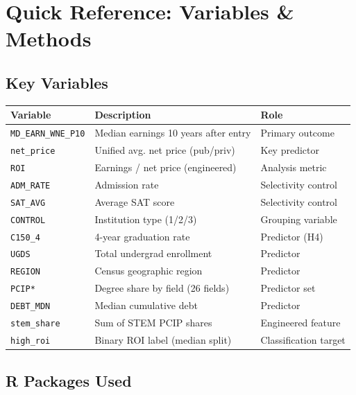 \documentclass[12pt, letterpaper]{article}
\begin{document}
\section{Quick Reference: Variables \& Methods}

\subsection{Key Variables}

\begin{center}
\begin{tabular}{p{3.5cm} p{6cm} p{3.5cm}}
\toprule
\textbf{Variable} & \textbf{Description} & \textbf{Role} \\
\midrule
\texttt{MD\_EARN\_WNE\_P10} & Median earnings 10 years after entry & Primary outcome \\
\texttt{net\_price} & Unified avg. net price (pub/priv) & Key predictor \\
\texttt{ROI} & Earnings / net price (engineered) & Analysis metric \\
\texttt{ADM\_RATE} & Admission rate & Selectivity control \\
\texttt{SAT\_AVG} & Average SAT score & Selectivity control \\
\texttt{CONTROL} & Institution type (1/2/3) & Grouping variable \\
\texttt{C150\_4} & 4-year graduation rate & Predictor (H4) \\
\texttt{UGDS} & Total undergrad enrollment & Predictor \\
\texttt{REGION} & Census geographic region & Predictor \\
\texttt{PCIP*} & Degree share by field (26 fields) & Predictor set \\
\texttt{DEBT\_MDN} & Median cumulative debt & Predictor \\
\texttt{stem\_share} & Sum of STEM PCIP shares & Engineered feature \\
\texttt{high\_roi} & Binary ROI label (median split) & Classification target \\
\bottomrule
\end{tabular}
\end{center}

\subsection{R Packages Used}
\end{document}
